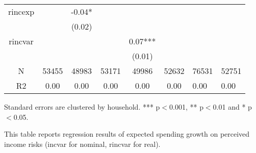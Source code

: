 \documentclass[12pt,notitlepage,onecolumn,aps,pra]{article}
\begin{document}
\begin{table}[p]
\begin{adjustbox}{width={0.9\textwidth}}
\begin{threeparttable}
\begin{tabular}{ccccccll}
rincexp   &            &      -0.04* &              &               &                &                 &                  \\
          &            &      (0.02) &              &               &                &                 &                  \\
rincvar   &            &             &              &       0.07*** &                &                 &                  \\
          &            &             &              &        (0.01) &                &                 &                  \\
N         &      53455 &       48983 &        53171 &         49986 &          52632 &           76531 &            52751 \\
R2        &       0.00 &        0.00 &         0.00 &          0.00 &           0.00 &            0.00 &             0.00 \\
\bottomrule
\end{tabular}
\begin{tablenotes}\item Standard errors are clustered by household. *** p$<$0.001, ** p$<$0.01 and * p$<$0.05. 
\item This table reports regression results of expected spending growth on perceived income risks (incvar for nominal, rincvar for real).
\end{tablenotes}
\end{threeparttable}
\end{adjustbox}
\end{table}       %
    
    



    
\end{document}
